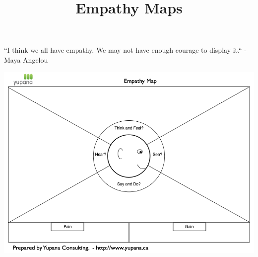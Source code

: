 \documentclass{ximera}
\title{Empathy Maps}
\begin{document}
\begin{abstract}

\end{abstract}
\maketitle

``I think we all have empathy. We may not have enough courage to display it.`` - Maya Angelou


\begin{image}
\includegraphics{Empathy-Map.png}
\end{image}
\end{document}
